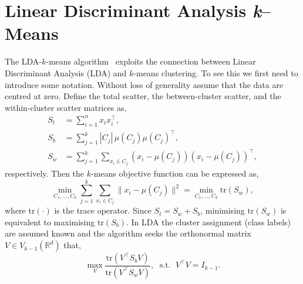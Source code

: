 \documentclass{book}
\def\R{\mathbb{R}}
\def\tr#1{\mathrm{tr}\left(#1\right)}
\begin{document}
\section{Linear Discriminant Analysis {\it k}--Means}\label{sec:ldakmeans}

The LDA-$k$-means algorithm~\cite{DingL2007} exploits the connection between
Linear Discriminant Analysis (LDA) and $k$-means clustering. To see 
this we first need to introduce some notation.
%
Without loss of generality assume that the data are centred at zero.
%
Define the total scatter, the between-cluster scatter, and the within-cluster
scatter matrices as,
%
\begin{align*}
%
S_t & = \sum_{i=1}^n x_i x_i^\top, \\
%
S_b & = \sum_{j=1}^k |C_j| \, \mu(C_j) \mu(C_j)^\top, \\
%
S_w & = \sum_{j=1}^k \sum_{x_i \in C_j} (x_i - \mu(C_j))(x_i - \mu(C_j))^\top,
%
\end{align*}
%
respectively. Then the $k$-means objective function can be expressed as,
%
\begin{equation}\label{eq:kmeans}
%
\min_{C_1,\ldots,C_k} \sum_{j=1}^k \sum_{x_i \in C_j} \|x_i - \mu(C_j)\|^2 = \min_{C_1,\ldots,C_k} \tr{S_w},
%
%
\end{equation}
where $\tr{\cdot}$ is the trace operator. Since $S_t = S_w + S_b$, minimising
$\tr{S_w}$ is equivalent to maximising $\tr{S_b}$.
%
In LDA the cluster assignment (class labels) are assumed known and the
algorithm seeks the orthonormal matrix $V \in V_{k-1}(\R^d)$ that,
%
\begin{equation}\label{eq:ldakm}
%
\max_{V} \frac{ \tr{V^\top S_b V}}{\tr{V^\top S_w V}}, \; \text{ s.t. } \; V^\top V = I_{k-1}.
%
\end{equation}
\end{document}
